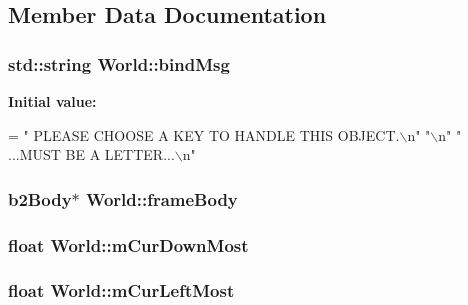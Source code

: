 \subsection{Member Data Documentation}
\hypertarget{classWorld_a08c11650552d3e7a723b09afc628dfb3}{}
\subsubsection[{bind\+Msg}]{\setlength{\rightskip}{0pt plus 5cm}std\+::string World\+::bind\+Msg\hspace{0.3cm}{\ttfamily [private]}}\label{classWorld_a08c11650552d3e7a723b09afc628dfb3}
{\bfseries Initial value\+:}
\begin{DoxyCode}
=
        \textcolor{stringliteral}{"  PLEASE CHOOSE A KEY TO HANDLE THIS OBJECT.\(\backslash\)n"}
        \textcolor{stringliteral}{"\(\backslash\)n"}
        \textcolor{stringliteral}{"  ...MUST BE A LETTER...\(\backslash\)n"}
\end{DoxyCode}
\hypertarget{classWorld_a2064bf96839978201b9b332dda472dee}{}
\subsubsection[{frame\+Body}]{\setlength{\rightskip}{0pt plus 5cm}b2\+Body$\ast$ World\+::frame\+Body\hspace{0.3cm}{\ttfamily [private]}}\label{classWorld_a2064bf96839978201b9b332dda472dee}
\hypertarget{classWorld_a6c703fe8401bc1516dd6e8c474a8a74f}{}
\subsubsection[{m\+Cur\+Down\+Most}]{\setlength{\rightskip}{0pt plus 5cm}float World\+::m\+Cur\+Down\+Most\hspace{0.3cm}{\ttfamily [protected]}}\label{classWorld_a6c703fe8401bc1516dd6e8c474a8a74f}
\hypertarget{classWorld_ac0a6a277c98bb22fbb5fd8c8b30da604}{}
\subsubsection[{m\+Cur\+Left\+Most}]{\setlength{\rightskip}{0pt plus 5cm}float World\+::m\+Cur\+Left\+Most\hspace{0.3cm}{\ttfamily [protected]}}\label{classWorld_ac0a6a277c98bb22fbb5fd8c8b30da604}
\hypertarget{classWorld_aa4304f0ded86d76a21f4fdaaa56ad382}{}
